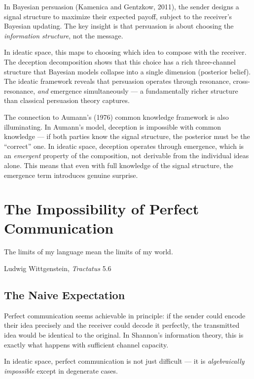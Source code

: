 In Bayesian persuasion (Kamenica and Gentzkow, 2011), the sender designs a signal structure to maximize their expected payoff, subject to the receiver's Bayesian updating. The key insight is that persuasion is about choosing the \emph{information structure}, not the message.

In ideatic space, this maps to choosing which idea to compose with the receiver. The deception decomposition shows that this choice has a rich three-channel structure that Bayesian models collapse into a single dimension (posterior belief). The ideatic framework reveals that persuasion operates through resonance, cross-resonance, \emph{and} emergence simultaneously --- a fundamentally richer structure than classical persuasion theory captures.

The connection to Aumann's (1976) common knowledge framework is also illuminating. In Aumann's model, deception is impossible with common knowledge --- if both parties know the signal structure, the posterior must be the ``correct'' one. In ideatic space, deception operates through emergence, which is an \emph{emergent} property of the composition, not derivable from the individual ideas alone. This means that even with full knowledge of the signal structure, the emergence term introduces genuine surprise.


\chapter{The Impossibility of Perfect Communication}

\epigraph{The limits of my language mean the limits of my world.}{Ludwig Wittgenstein, \textit{Tractatus} 5.6}

\section{The Naive Expectation}

Perfect communication seems achievable in principle: if the sender could encode their idea precisely and the receiver could decode it perfectly, the transmitted idea would be identical to the original. In Shannon's information theory, this is exactly what happens with sufficient channel capacity.

In ideatic space, perfect communication is not just difficult --- it is \emph{algebraically impossible} except in degenerate cases.

